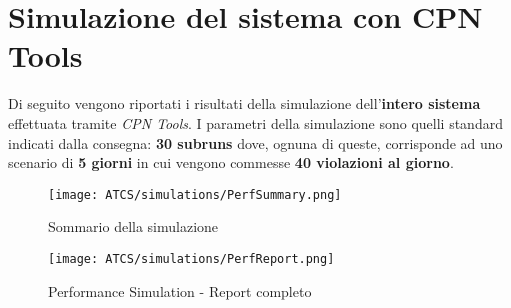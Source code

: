 \documentclass[../Relazione.tex]{subfiles}
\begin{document}
\section{Simulazione del sistema con CPN Tools}
Di seguito vengono riportati i risultati della simulazione  dell'\textbf{intero sistema} effettuata tramite \textit{CPN Tools}. I parametri della simulazione sono quelli standard indicati dalla consegna: \textbf{30 subruns} dove, ognuna di queste,  corrisponde ad uno scenario di \textbf{5 giorni} in cui vengono commesse \textbf{40 violazioni al giorno}.

    \begin{figure}[!h]
        \captionsetup{singlelinecheck = false, format= hang, justification=raggedright, font=footnotesize, labelsep=space}
        \texttt{[image: ATCS/simulations/PerfSummary.png]}
        \caption{Sommario della simulazione}
        \label{fig:PerfSummary}
    \end{figure}
    
    \begin{figure}[!h]
        \centering
        \texttt{[image: ATCS/simulations/PerfReport.png]}
        \caption{Performance Simulation - Report completo}
        \label{fig:PerfReport}
    \end{figure}
    
\end{document}
